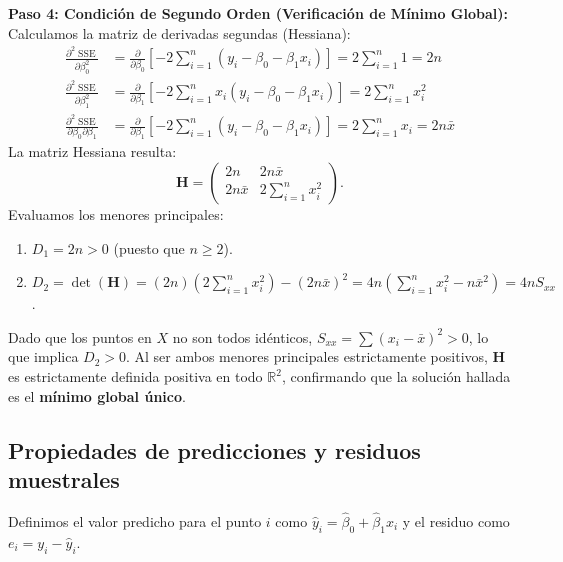 \documentclass[11pt,a4paper]{article}
\begin{document}
\begin{demobox}
\textbf{Paso 4: Condición de Segundo Orden (Verificación de Mínimo Global):}  
Calculamos la matriz de derivadas segundas (Hessiana):
\begin{align}
\frac{\partial^2 \operatorname{SSE}}{\partial \beta_0^2} &= \frac{\partial}{\partial \beta_0}\left[ -2\sum_{i=1}^n (y_i - \beta_0 - \beta_1 x_i) \right] = 2\sum_{i=1}^n 1 = 2n \\
\frac{\partial^2 \operatorname{SSE}}{\partial \beta_1^2} &= \frac{\partial}{\partial \beta_1}\left[ -2\sum_{i=1}^n x_i(y_i - \beta_0 - \beta_1 x_i) \right] = 2\sum_{i=1}^n x_i^2 \\
\frac{\partial^2 \operatorname{SSE}}{\partial \beta_0 \partial \beta_1} &= \frac{\partial}{\partial \beta_1}\left[ -2\sum_{i=1}^n (y_i - \beta_0 - \beta_1 x_i) \right] = 2\sum_{i=1}^n x_i = 2n\bar{x}
\end{align}
La matriz Hessiana resulta:
\begin{equation}
\mathbf{H} = \begin{pmatrix} 2n & 2n\bar{x} \\ 2n\bar{x} & 2\sum_{i=1}^n x_i^2 \end{pmatrix}.
\end{equation}
Evaluamos los menores principales:
\begin{enumerate}
    \item $D_1 = 2n > 0$ (puesto que $n \ge 2$).
    \item $D_2 = \det(\mathbf{H}) = (2n)\left(2\sum_{i=1}^n x_i^2\right) - (2n\bar{x})^2 = 4n \left( \sum_{i=1}^n x_i^2 - n\bar{x}^2 \right) = 4n S_{xx}$.
\end{enumerate}
Dado que los puntos en $X$ no son todos idénticos, $S_{xx} = \sum (x_i - \bar{x})^2 > 0$, lo que implica $D_2 > 0$. Al ser ambos menores principales estrictamente positivos, $\mathbf{H}$ es estrictamente definida positiva en todo $\mathbb{R}^2$, confirmando que la solución hallada es el \textbf{mínimo global único}.
\end{demobox}



\subsection{Propiedades de predicciones y residuos muestrales}

Definimos el valor predicho para el punto $i$ como $\hat{y}_i = \hat{\beta}_0 + \hat{\beta}_1 x_i$ y el residuo como $e_i = y_i - \hat{y}_i$.
\end{document}
